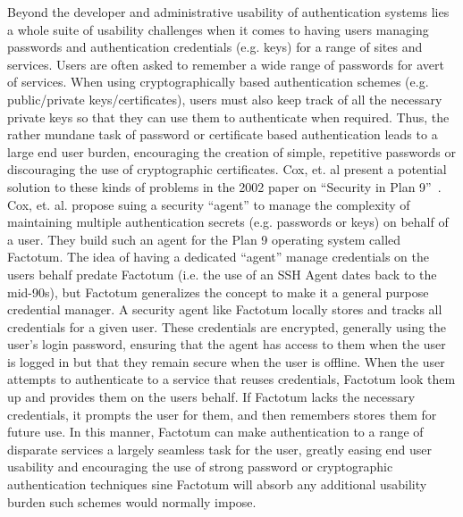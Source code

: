 \documentclass{sig-alternate}
\begin{document}
Beyond the developer and administrative usability of authentication
systems lies a whole suite of usability challenges when it comes to
having users managing passwords and authentication credentials
(e.g. keys) for a range of sites and services. Users are often asked
to remember a wide range of passwords for avert of services. When
using cryptographically based authentication schemes
(e.g. public/private keys/certificates), users must also keep track of
all the necessary private keys so that they can use them to
authenticate when required. Thus, the rather mundane task of password
or certificate based authentication leads to a large end user burden,
encouraging the creation of simple, repetitive passwords or
discouraging the use of cryptographic certificates. Cox, et. al
present a potential solution to these kinds of problems in the 2002
paper on ``Security in Plan 9''~\cite{Cox2002}. Cox, et. al. propose
suing a security ``agent'' to manage the complexity of maintaining
multiple authentication secrets (e.g. passwords or keys) on behalf of
a user. They build such an agent for the Plan 9 operating system
called Factotum. The idea of having a dedicated ``agent'' manage
credentials on the users behalf predate Factotum (i.e. the use of an
SSH Agent dates back to the mid-90s), but Factotum generalizes the
concept to make it a general purpose credential manager. A security
agent like Factotum locally stores and tracks all credentials for a
given user. These credentials are encrypted, generally using the
user's login password, ensuring that the agent has access to them when
the user is logged in but that they remain secure when the user is
offline. When the user attempts to authenticate to a service that
reuses credentials, Factotum look them up and provides them on the
users behalf. If Factotum lacks the necessary credentials, it prompts
the user for them, and then remembers stores them for future use. In
this manner, Factotum can make authentication to a range of disparate
services a largely seamless task for the user, greatly easing end user
usability and encouraging the use of strong password or cryptographic
authentication techniques sine Factotum will absorb any additional
usability burden such schemes would normally impose.
\end{document}
